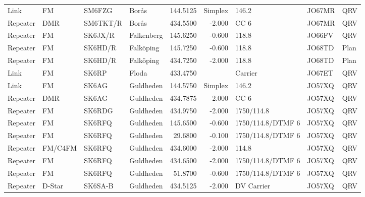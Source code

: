 \begin{landscape}
\begin{longtable}{llllrrlll}
	Link     & FM              & SM6FZG   & Borås                 &     144.5125 &    Simplex & 146.2             & JO67MR      & QRV      \\
	Repeater & DMR             & SM6TKT/R & Borås                 &     434.5500 &     -2.000 & CC 6              & JO67MR      & QRV      \\
	Repeater & FM              & SK6JX/R  & Falkenberg            &     145.6250 &     -0.600 & 118.8             & JO66FV      & QRV      \\
	Repeater & FM              & SK6HD/R  & Falköping             &     145.7250 &     -0.600 & 118.8             & JO68TD      & Plan     \\
	Repeater & FM              & SK6HD/R  & Falköping             &     434.7250 &     -2.000 & 118.8             & JO68TD      & Plan     \\
	Link     & FM              & SK6RP    & Floda                 &     433.4750 &            & Carrier           & JO67ET      & QRV      \\
	Link     & FM              & SK6AG    & Guldheden             &     144.5750 &    Simplex & 146.2             & JO57XQ      & QRV      \\
	Repeater & DMR             & SK6AG    & Guldheden             &     434.7875 &     -2.000 & CC 6              & JO57XQ      & QRV      \\
	Repeater & FM              & SK6RDG   & Guldheden             &     434.9750 &     -2.000 & 1750/114.8        & JO57XQ      & QRV      \\
	Repeater & FM              & SK6RFQ   & Guldheden             &     145.6500 &     -0.600 & 1750/114.8/DTMF 6 & JO57XQ      & QRV      \\
	Repeater & FM              & SK6RFQ   & Guldheden             &      29.6800 &     -0.100 & 1750/114.8/DTMF 6 & JO57XQ      & QRV      \\
	Repeater & FM/C4FM         & SK6RFQ   & Guldheden             &     434.6000 &     -2.000 & 114.8             & JO57XQ      & QRV      \\
	Repeater & FM              & SK6RFQ   & Guldheden             &     434.6500 &     -2.000 & 1750/114.8/DTMF 6 & JO57XQ      & QRV      \\
	Repeater & FM              & SK6RFQ   & Guldheden             &      51.8700 &     -0.600 & 1750/114.8/DTMF 6 & JO57XQ      & QRV      \\
	Repeater & D-Star          & SK6SA-B  & Guldheden             &     434.5125 &     -2.000 & DV Carrier        & JO57XQ      & QRV      \\

\end{longtable}
\end{landscape}
